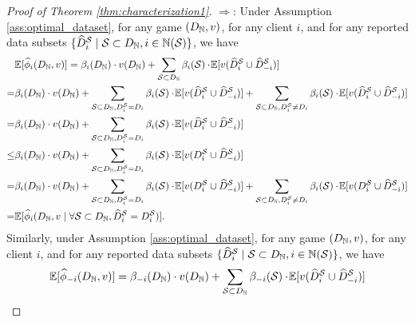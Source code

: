 \begin{proof}[Proof of Theorem \ref{thm:characterization1}]
	$\Rightarrow$: Under Assumption \ref{ass:optimal_dataset}, for any game $(D_{\mathbb{N}}, v)$, for any client $i$, and for any reported data subsets $\{\widehat{D}^{\mathcal{S}}_{i}\mid \mathcal{S} \subset D_{\mathbb{N}}, i \in \mathbb{N}(\mathcal{S}) \}$, we have
	\begin{align*}
		&\mathbb{E}[\widehat{\phi}_{i}(D_{\mathbb{N}}, v)] = \beta_i(D_{\mathbb{N}}) \cdot v(D_{\mathbb{N}}) +\sum_{\mathcal{S}\subset D_{\mathbb{N}}} \beta_i(\mathcal{S}) \cdot\! \mathbb{E}[v(\widehat{D}^{\mathcal{S}}_{i} \cup \widehat{D}^{\mathcal{S}}_{-i})]\\
		= & \beta_i(D_{\mathbb{N}}) \cdot v(D_{\mathbb{N}}) +\sum_{\mathcal{S}\subset D_{\mathbb{N}}, D^{\mathcal{S}}_{i} = D_i} \beta_i(\mathcal{S}) \cdot\! \mathbb{E}[v(\widehat{D}^{\mathcal{S}}_{i} \cup \widehat{D}^{\mathcal{S}}_{-i})] +\sum_{\mathcal{S}\subset D_{\mathbb{N}}, D^{\mathcal{S}}_{i} \neq D_i} \beta_i(\mathcal{S}) \cdot\! \mathbb{E}[v(\widehat{D}^{\mathcal{S}}_{i} \cup \widehat{D}^{\mathcal{S}}_{-i})] \\
		= & \beta_i(D_{\mathbb{N}}) \cdot v(D_{\mathbb{N}}) +\sum_{\mathcal{S}\subset D_{\mathbb{N}}, D^{\mathcal{S}}_{i} = D_i} \beta_i(\mathcal{S}) \cdot\! \mathbb{E}[v(\widehat{D}^{\mathcal{S}}_{i} \cup \widehat{D}^{\mathcal{S}}_{-i})] \\
		\leq &\beta_i(D_{\mathbb{N}}) \cdot v(D_{\mathbb{N}}) +\sum_{\mathcal{S}\subset D_{\mathbb{N}}, D^{\mathcal{S}}_{i} = D_i} \beta_i(\mathcal{S}) \cdot\! \mathbb{E}[v(D^{\mathcal{S}}_{i} \cup \widehat{D}^{\mathcal{S}}_{-i})] \\
		= &\beta_i(D_{\mathbb{N}}) \cdot v(D_{\mathbb{N}}) +\sum_{\mathcal{S}\subset D_{\mathbb{N}}, D^{\mathcal{S}}_{i} = D_i} \beta_i(\mathcal{S}) \cdot\! \mathbb{E}[v(D^{\mathcal{S}}_{i} \cup \widehat{D}^{\mathcal{S}}_{-i})] +\sum_{\mathcal{S}\subset D_{\mathbb{N}}, D^{\mathcal{S}}_{i} \neq D_i} \beta_i(\mathcal{S}) \cdot\! \mathbb{E}[v(D^{\mathcal{S}}_{i} \cup \widehat{D}^{\mathcal{S}}_{-i})]\\
		= & \mathbb{E}[\widehat{\phi}_{i}(D_{\mathbb{N}}, v \mid \forall \mathcal{S} \subset D_{\mathbb{N}}, \widehat{D}^{\mathcal{S}}_{i} = D^{\mathcal{S}}_{i})].
	\end{align*}
	Similarly, under Assumption \ref{ass:optimal_dataset}, for any game $(D_{\mathbb{N}}, v)$, for any client $i$, and for any reported data subsets $\{\widehat{D}^{\mathcal{S}}_{i}\mid \mathcal{S} \subset D_{\mathbb{N}}, i \in \mathbb{N}(\mathcal{S}) \}$, we have
	\begin{align*}
		&\mathbb{E}[\empiricaldatavalue_{-i}(\granddataset, v)] = \beta_{-i}(\granddataset) \cdot v(\granddataset) +\sum_{\datasubset\subset \granddataset} \beta_{-i}(\datasubset) \cdot\! \mathbb{E}[v(\reportedstoi \cup \reportedstominusi)]\\

\end{align*}
\end{proof}
